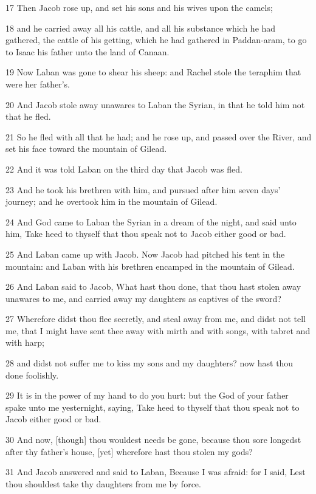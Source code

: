 \par 17 Then Jacob rose up, and set his sons and his wives upon the camels;
\par 18 and he carried away all his cattle, and all his substance which he had gathered, the cattle of his getting, which he had gathered in Paddan-aram, to go to Isaac his father unto the land of Canaan.
\par 19 Now Laban was gone to shear his sheep: and Rachel stole the teraphim that were her father's.
\par 20 And Jacob stole away unawares to Laban the Syrian, in that he told him not that he fled.
\par 21 So he fled with all that he had; and he rose up, and passed over the River, and set his face toward the mountain of Gilead.
\par 22 And it was told Laban on the third day that Jacob was fled.
\par 23 And he took his brethren with him, and pursued after him seven days' journey; and he overtook him in the mountain of Gilead.
\par 24 And God came to Laban the Syrian in a dream of the night, and said unto him, Take heed to thyself that thou speak not to Jacob either good or bad.
\par 25 And Laban came up with Jacob. Now Jacob had pitched his tent in the mountain: and Laban with his brethren encamped in the mountain of Gilead.
\par 26 And Laban said to Jacob, What hast thou done, that thou hast stolen away unawares to me, and carried away my daughters as captives of the sword?
\par 27 Wherefore didst thou flee secretly, and steal away from me, and didst not tell me, that I might have sent thee away with mirth and with songs, with tabret and with harp;
\par 28 and didst not suffer me to kiss my sons and my daughters? now hast thou done foolishly.
\par 29 It is in the power of my hand to do you hurt: but the God of your father spake unto me yesternight, saying, Take heed to thyself that thou speak not to Jacob either good or bad.
\par 30 And now, [though] thou wouldest needs be gone, because thou sore longedst after thy father's house, [yet] wherefore hast thou stolen my gods?
\par 31 And Jacob answered and said to Laban, Because I was afraid: for I said, Lest thou shouldest take thy daughters from me by force.
